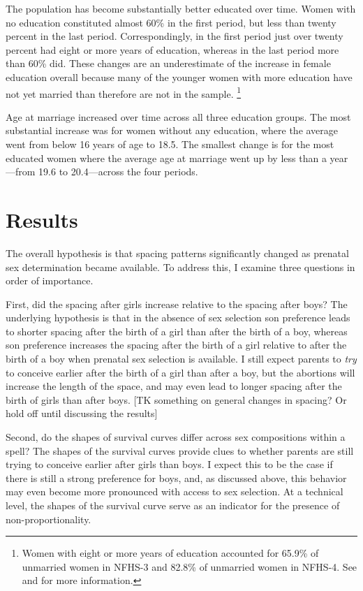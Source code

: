 \documentclass[12pt,letterpaper]{article}
\begin{document}
The population has become substantially better educated over time.
Women with no education constituted almost 60\% 
in the first period, but less than twenty percent in the last period.
Correspondingly, in the first period just over twenty percent had eight or more 
years of education, whereas in the last period more than 60\% did.
These changes are an underestimate of the increase in female
education overall because many of the younger women with more education
have not yet married than therefore are not in the sample.%
\footnote{
Women with eight or more years of education accounted for 65.9\% of
unmarried women in NFHS-3 and 82.8\% of unmarried women in NFHS-4.
See \citet[p 56]{International-Institute-for-Population-Sciences-IIPS2007}
and \citet[p 61]{International-Institute-for-Population-Sciences-IIPS2017}
for more information.
 }

Age at marriage increased over time across all three education groups.
The most substantial increase was for women without any education, where
the average went from below 16 years of age to 18.5.
The smallest change is for the most educated women where the average age
at marriage went up by less than a year---from 19.6 to 20.4---across the 
four periods.


\section{Results\label{sec:results}}


The overall hypothesis is that spacing patterns significantly changed 
as prenatal sex determination became available.
To address this, I examine three questions in order of importance.

First, did the spacing after girls increase relative to the spacing
after boys?
The underlying hypothesis is that in the absence of sex selection son 
preference leads to shorter spacing after the birth of a girl than after the 
birth of a boy, whereas son preference increases the spacing after the birth 
of a girl relative to after the birth of a boy when prenatal sex selection is 
available.
I still expect parents to \emph{try} to conceive earlier after the birth 
of a girl than after a boy, but the abortions will increase the 
length of the space, and may even lead to longer spacing after the
birth of girls than after boys.
[TK something on general changes in spacing? Or hold off until discussing the
results]

Second, do the shapes of survival curves differ across sex compositions 
within a spell?
The shapes of the survival curves provide clues to whether parents are
still trying to conceive earlier after girls than boys.
I expect this to be the case if there is still a strong preference for
boys, and, as discussed above, this behavior may even become more pronounced
with access to sex selection.
At a technical level, the shapes of the survival curve serve as an
indicator for the presence of non-proportionality.
\end{document}
